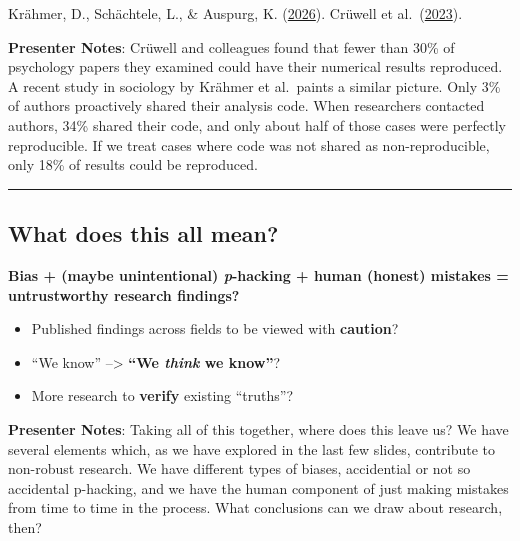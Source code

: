 \documentclass[
  english,
  letterpaper,
  DIV=11,
  numbers=noendperiod]{scrartcl}
\providecommand{\tightlist}{%
  \setlength{\itemsep}{0pt}\setlength{\parskip}{0pt}}
\begin{document}
Krähmer, D., Schächtele, L., \& Auspurg, K.
(\href{https://doi.org/10.1098/rsos.251997}{2026}). Crüwell et
al.~(\href{https://doi.org/10.1177/09567976221140828}{2023}).

\textbf{Presenter Notes}: Crüwell and colleagues found that fewer than
30\% of psychology papers they examined could have their numerical
results reproduced. A recent study in sociology by Krähmer et al.~paints
a similar picture. Only 3\% of authors proactively shared their analysis
code. When researchers contacted authors, 34\% shared their code, and
only about half of those cases were perfectly reproducible. If we treat
cases where code was not shared as non-reproducible, only 18\% of
results could be reproduced.

\begin{center}\rule{0.5\linewidth}{0.5pt}\end{center}

\subsection{What does this all mean?}\label{what-does-this-all-mean}

\textbf{Bias + (maybe unintentional) \emph{p}-hacking + human (honest)
mistakes = untrustworthy research findings?}

\begin{tcolorbox}[enhanced jigsaw, arc=.35mm, bottomrule=.15mm, bottomtitle=1mm, breakable, colback=white, colbacktitle=quarto-callout-note-color!10!white, colframe=quarto-callout-note-color-frame, coltitle=black, left=2mm, leftrule=.75mm, opacityback=0, opacitybacktitle=0.6, rightrule=.15mm, title=\textcolor{quarto-callout-note-color}{\faInfo}\hspace{0.5em}{Note}, titlerule=0mm, toprule=.15mm, toptitle=1mm]

\begin{itemize}
\tightlist
\item
  Published findings across fields to be viewed with \textbf{caution}?
\item
  ``We know'' --\textgreater{} \textbf{``We \emph{think} we know''}?
\item
  More research to \textbf{verify} existing ``truths''?
\end{itemize}

\end{tcolorbox}

\textbf{Presenter Notes}: Taking all of this together, where does this
leave us? We have several elements which, as we have explored in the
last few slides, contribute to non-robust research. We have different
types of biases, accidential or not so accidental p-hacking, and we have
the human component of just making mistakes from time to time in the
process. What conclusions can we draw about research, then?
\end{document}
